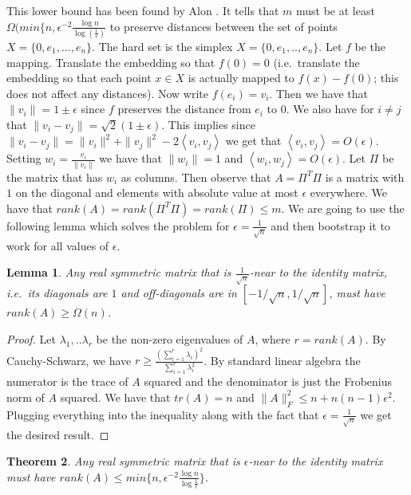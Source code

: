 \documentclass[11pt]{article}
\newcommand{\inprod}[1]{\left\langle #1 \right\rangle}
\newtheorem{theorem}{Theorem}
\newtheorem{lemma}[theorem]{Lemma}
\begin{document}
This lower bound has been found by Alon \cite{Alon}. It tells that $m$ must be at least $\Omega( min\{n, \epsilon^{-2} \frac{\log n}{\log(\frac{1}{\epsilon})}$ to preserve distances between the set of points $X = \{0,e_1,\ldots,e_n\}$. The hard set is the simplex $X= \{0,e_1,..,e_n\}$. Let $f$ be the mapping. Translate the embedding so that $f(0) = 0$ (i.e.\ translate the embedding so that each point $x\in X$ is actually mapped to $f(x) - f(0)$; this does not affect any distances). Now write $f(e_i) = v_i$. Then we have that $\|v_i\| = 1 \pm \epsilon$ since $f$ preserves the distance from $e_i$ to $0$. We also have for $i\neq j$ that $\|v_i - v_j \| = \sqrt{2} (1\pm \epsilon)$. This implies since $\|v_i-v_j\| = \|v_i\|^2 + \|v_j\|^2 - 2\inprod{v_i,v_j}$ we get that $\inprod{v_i,v_j}= O(\epsilon)$. Setting $w_i = \frac{v_i}{\|v_i\|}$ we have that $\|w_i\| =1$ and $\inprod{w_i,w_j} = O(\epsilon)$. Let $\Pi$ be the matrix that has $w_i$ as columns. Then observe that $A = \Pi^T \Pi$ is a matrix with $1$ on the diagonal and elements with absolute value at most $\epsilon$ everywhere. We have that $rank(A) = rank( \Pi^T \Pi) = rank(\Pi) \leq m$. We are going to use the following lemma which solves the problem for $\epsilon = \frac{1}{\sqrt{n}}$ and then bootstrap it to work for all values of $\epsilon$.

\begin{lemma}
Any real symmetric matrix that is $\frac{1}{\sqrt{n}}$-near to the identity matrix, i.e.\ its diagonals are $1$ and off-diagonals are in $[-1/\sqrt{n}, 1/\sqrt{n}]$, must have $rank(A) \geq \Omega(n)$. 
\end{lemma}

\begin{proof}

Let $\lambda_1,..\lambda_r$ be the non-zero eigenvalues of $A$, where $r=rank(A)$. By Cauchy-Schwarz, we have $r \geq \frac{ (\sum_{i=1}^r \lambda_i )^2 }{\sum_{i=1}^r \lambda_i^2}$. By standard linear algebra the numerator is the trace of $A$ squared and the denominator is just the Frobenius norm of $A$ squared. We have that $tr(A)=n$ and $\|A\|_F^2 \leq n + n(n-1)\epsilon^2$. Plugging everything into the inequality along with the fact that $\epsilon = \frac{1}{\sqrt{n}}$ we get the desired result.

\end{proof}


\begin{theorem}

Any real symmetric matrix that is $\epsilon$-near to the identity matrix must have $rank(A) \leq min\{ n, \epsilon^{-2} \frac{\log n}{\log\frac{1}{\epsilon} } \}$. 
\end{theorem}
\end{document}
